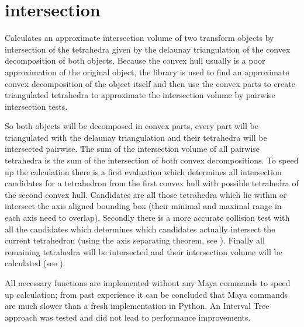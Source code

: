 \documentclass[letterpaper,10pt,english]{sphinxmanual}
\begin{document}
\section{intersection}
\label{\detokenize{pk_src.intersection:intersection}}\label{\detokenize{pk_src.intersection::doc}}\label{\detokenize{pk_src.intersection:id1}}
{\hyperref[\detokenize{index:commands}]{}}
\label{\detokenize{pk_src.intersection:module-pk_src.intersection}}
Calculates an approximate intersection volume of two transform objects by intersection of the tetrahedra given by the delaunay triangulation of the convex decomposition of both objects. Because the convex hull usually is a poor approximation of the original object, the  library is used to find an approximate convex decomposition of the object itself and then use the convex parts to create triangulated tetrahedra to approximate the intersection volume by pairwise intersection tests.

So both objects will be decomposed in convex parts, every part will be triangulated with the delaunay triangulation and their tetrahedra will be intersected pairwise. The sum of the intersection volume of all pairwise tetrahedra is the sum of the intersection of both convex decompositions. To speed up the calculation there is a first evaluation which determines all intersection candidates for a tetrahedron from the first convex hull with possible tetrahedra of the second convex hull. Candidates are all those tetrahedra which lie within or intersect the axis aligned bounding box (their minimal and maximal range in each axis need to overlap). Secondly there is a more accurate collision test with all the candidates which determines which candidates actually intersect the current tetrahedron (using the axis separating theorem, see {\hyperref[\detokenize{pk_src.collision_tet_tet:collision-tet-tet}]{}}). Finally all remaining tetrahedra will be intersected and their intersection volume will be calculated (see {\hyperref[\detokenize{pk_src.intersection_tet_tet:intersection-tet-tet}]{}}).

All necessary functions are implemented without any Maya commands to speed up calculation; from past experience it can be concluded that Maya commands are much slower than a fresh implementation in Python.
An Interval Tree approach was tested and did not lead to performance improvements.
\end{document}
